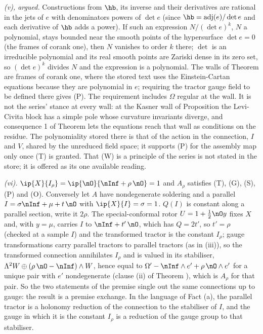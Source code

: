 \emph{(v), argued.} Constructions from $\hb$, its inverse and their derivatives are rational in the jets of $e$ with denominators powers of $\det e$ (since $\hb = \mathrm{adj}(e)/\det e$ and each derivative of $\hb$ adds a power). If such an expression $N/(\det e)^{k}$, $N$ a polynomial, stays bounded near the smooth points of the hypersurface $\det e = 0$ (the frames of corank one), then $N$ vanishes to order $k$ there; $\det$ is an irreducible polynomial and its real smooth points are Zariski dense in its zero set, so $(\det e)^{k}$ divides $N$ and the expression is a polynomial. The walls of Theorem  are frames of corank one, where the stored text uses the Einstein-Cartan equations because they are polynomial in $e$; requiring the tractor gauge field to be defined there gives (P). The requirement includes $\Omega$ regular at the wall. It is not the series' stance at every wall: at the Kasner wall of Proposition  the Levi-Civita block has a simple pole whose curvature invariants diverge, and consequence 1 of Theorem  lets the equations reach that wall as conditions on the residue. The polynomiality stored there is that of the action in the connection, $I$ and $V$, shared by the unreduced field space; it supports (P) for the assembly map only once (T) is granted. That (W) is a principle of the series is not stated in the store; it is offered as its one available reading.

\emph{(vi).} $\ip{X}{I_{\rho}} = \ip{\nO}{\nInf + \rho\,\nO} = 1$ and $A_{\rho}$ satisfies (T), (G), (S), (P) and (O). Conversely let $A$ have nondegenerate soldering and a parallel $I = \sigma\nInf + \mu + t\,\nO$ with $\ip{X}{I} = \sigma = 1$. $Q(I)$ is constant along a parallel section, write it $2\rho$. The special-conformal rotor $U = 1 + \tfrac12\nO y$ fixes $X$ and, with $y = \mu$, carries $I$ to $\nInf + t'\,\nO$, which has $Q = 2t'$, so $t' = \rho$ (checked at a sample $I$) and the transformed tractor is the constant $I_{\rho}$; gauge transformations carry parallel tractors to parallel tractors (as in (iii)), so the transformed connection annihilates $I_{\rho}$ and is valued in its stabiliser, $\Lambda^{2}W \oplus (\rho\,\nO - \nInf) \wedge W$, hence equal to $\Omega' - \nInf \wedge e' + \rho\,\nO \wedge e'$ for a unique pair with $e'$ nondegenerate (clause (ii) of Theorem ), which is $A_{\rho}$ for that pair. So the two statements of the premise single out the same connections up to gauge: the result is a premise exchange. In the language of Fact (a), the parallel tractor is a holonomy reduction of the connection to the stabiliser of $I$, and the gauge in which it is the constant $I_{\rho}$ is a reduction of the gauge group to that stabiliser.

